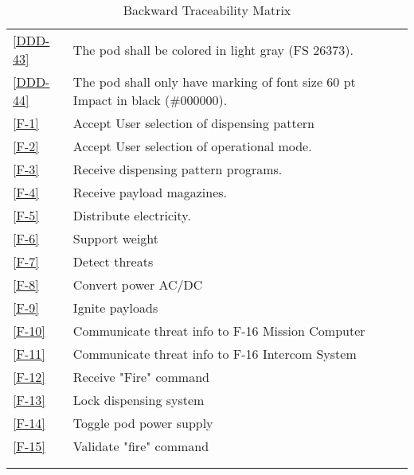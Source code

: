 \documentclass[Main]{subfiles}
\begin{document}
\begin{longtable}{l p{10.4cm} p{1.8cm} }
\ref{DDD-43} & The pod shall be colored in light gray (FS 26373). & \\

\ref{DDD-44} & The pod shall only have marking of font size 60 pt Impact in black (\#000000). & \\

\ref{F-1} & Accept User selection of dispensing pattern & \\

\ref{F-2} & Accept User selection of operational mode.& \\

\ref{F-3} & Receive dispensing pattern programs.& \\

\ref{F-4} & Receive payload magazines. & \\

\ref{F-5} & Distribute electricity.& \\

\ref{F-6} & Support weight& \\

\ref{F-7} & Detect threats& \\

\ref{F-8} & Convert power AC/DC& \\

\ref{F-9} & Ignite payloads& \\

\ref{F-10} & Communicate threat info to F-16 Mission Computer& \\

\ref{F-11} & Communicate threat info to F-16 Intercom System& \\

\ref{F-12} & Receive "Fire" command& \\

\ref{F-13} & Lock dispensing system& \\

\ref{F-14} & Toggle pod power supply& \\

\ref{F-15} & Validate "fire" command& \\


\\\hline
\caption{Backward Traceability Matrix}
\label{Tab:Backward}
\end{longtable}
\end{document}
